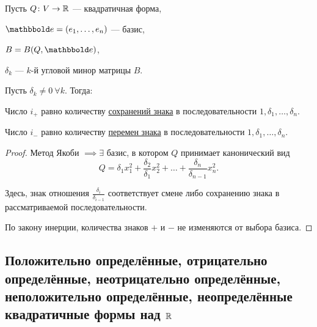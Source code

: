 Пусть $Q \colon V \to \mathbb{R}$ --- квадратичная форма,

$\E = (e_1, \dots, e_n)$ --- базис,

$B = B(Q, \E)$, 

$\delta_k$ --- $k$-й угловой минор матрицы $B$.


\begin{corollary}
    Пусть $\delta_k \neq 0 \ \forall k$. Тогда:

    Число $i_+$ равно количеству \underline{сохранений знака} в последовательности $1, \delta_1, \dots, \delta_n$.

    Число $i_-$ равно количеству \underline{перемен знака} в последовательности $1, \delta_1, \dots, \delta_n$.
\end{corollary}

\begin{proof}
    Метод Якоби $ \implies \exists $ базис, в котором $Q$ принимает канонический вид
    \begin{equation*}
        Q = \delta_1 x_1^2 + \frac{\delta_2}{\delta_1} x_2^2 + \dots + \frac{\delta_n}{\delta_{n - 1}} x_{n}^2
    .\end{equation*}

    Здесь, знак отношения $\frac{\delta_i}{\delta_{i - 1}}$ соответствует смене либо сохранению знака в рассматриваемой последовательности.

    По закону инерции, количества знаков $+$ и $-$ не изменяются от выбора базиса.
\end{proof}


\subsection{Положительно определённые, отрицательно определённые, неотрицательно определённые, неположительно определённые, неопределённые квадратичные формы над $\mathbb{R}$}

